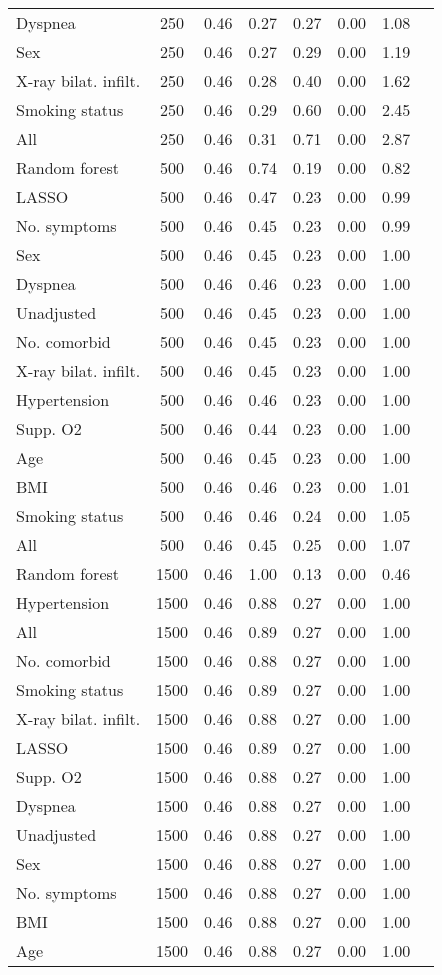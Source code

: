 \documentclass{article}
\begin{document}
{\begin{longtable}{lccccccc}
Dyspnea & 250 & 0.46 & 0.27 & 0.27 & 0.00 & 1.08 \\ 
Sex & 250 & 0.46 & 0.27 & 0.29 & 0.00 & 1.19 \\ 
X-ray bilat. infilt. & 250 & 0.46 & 0.28 & 0.40 & 0.00 & 1.62 \\ 
Smoking status & 250 & 0.46 & 0.29 & 0.60 & 0.00 & 2.45 \\ 
All & 250 & 0.46 & 0.31 & 0.71 & 0.00 & 2.87 \\ \midrule() 
Random forest & 500 & 0.46 & 0.74 & 0.19 & 0.00 & 0.82 \\ 
LASSO & 500 & 0.46 & 0.47 & 0.23 & 0.00 & 0.99 \\ 
No. symptoms & 500 & 0.46 & 0.45 & 0.23 & 0.00 & 0.99 \\ 
Sex & 500 & 0.46 & 0.45 & 0.23 & 0.00 & 1.00 \\ 
Dyspnea & 500 & 0.46 & 0.46 & 0.23 & 0.00 & 1.00 \\ 
Unadjusted & 500 & 0.46 & 0.45 & 0.23 & 0.00 & 1.00 \\ 
No. comorbid & 500 & 0.46 & 0.45 & 0.23 & 0.00 & 1.00 \\ 
X-ray bilat. infilt. & 500 & 0.46 & 0.45 & 0.23 & 0.00 & 1.00 \\ 
Hypertension & 500 & 0.46 & 0.46 & 0.23 & 0.00 & 1.00 \\ 
Supp. O2 & 500 & 0.46 & 0.44 & 0.23 & 0.00 & 1.00 \\ 
Age & 500 & 0.46 & 0.45 & 0.23 & 0.00 & 1.00 \\ 
BMI & 500 & 0.46 & 0.46 & 0.23 & 0.00 & 1.01 \\ 
Smoking status & 500 & 0.46 & 0.46 & 0.24 & 0.00 & 1.05 \\ 
All & 500 & 0.46 & 0.45 & 0.25 & 0.00 & 1.07 \\ \midrule() 
Random forest & 1500 & 0.46 & 1.00 & 0.13 & 0.00 & 0.46 \\ 
Hypertension & 1500 & 0.46 & 0.88 & 0.27 & 0.00 & 1.00 \\ 
All & 1500 & 0.46 & 0.89 & 0.27 & 0.00 & 1.00 \\ 
No. comorbid & 1500 & 0.46 & 0.88 & 0.27 & 0.00 & 1.00 \\ 
Smoking status & 1500 & 0.46 & 0.89 & 0.27 & 0.00 & 1.00 \\ 
X-ray bilat. infilt. & 1500 & 0.46 & 0.88 & 0.27 & 0.00 & 1.00 \\ 
LASSO & 1500 & 0.46 & 0.89 & 0.27 & 0.00 & 1.00 \\ 
Supp. O2 & 1500 & 0.46 & 0.88 & 0.27 & 0.00 & 1.00 \\ 
Dyspnea & 1500 & 0.46 & 0.88 & 0.27 & 0.00 & 1.00 \\ 
Unadjusted & 1500 & 0.46 & 0.88 & 0.27 & 0.00 & 1.00 \\ 
Sex & 1500 & 0.46 & 0.88 & 0.27 & 0.00 & 1.00 \\ 
No. symptoms & 1500 & 0.46 & 0.88 & 0.27 & 0.00 & 1.00 \\ 
BMI & 1500 & 0.46 & 0.88 & 0.27 & 0.00 & 1.00 \\ 
Age & 1500 & 0.46 & 0.88 & 0.27 & 0.00 & 1.00 \\
\bottomrule
\hline
\end{longtable}
}

\clearpage
\end{document}
